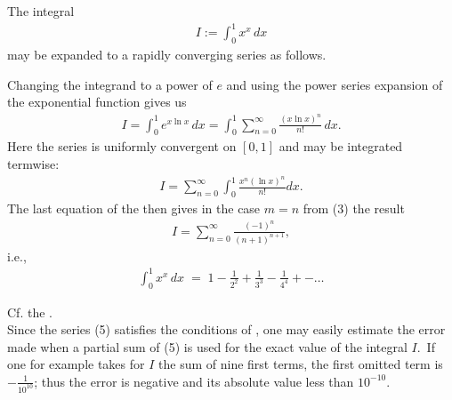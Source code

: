 \documentclass[12pt]{article}
\begin{document}
The integral
\begin{align}
I := \int_0^1 x^x\, dx
\end{align}
may be expanded to a rapidly converging series as follows.

Changing the integrand to a power of $e$ and using the power series expansion of the 
exponential function gives us
\begin{align}
I = \int_0^1 e^{x\ln x}\, dx 
= \int_0^1 \sum_{n=0}^\infty\frac{(x\ln x)^n}{n!}\, dx.
\end{align}
Here the series is uniformly convergent on $[0,1]$ and may be 
integrated termwise:
\begin{align}
I = \sum_{n=0}^\infty\int_0^1\frac{x^n(\ln x)^n}{n!}dx.
\end{align}
The last equation of the  
then gives in the case $m = n$ from (3) the result
\begin{align}
I = \sum_{n=0}^\infty\frac{(-1)^n}{(n\!+\!1)^{n+1}},
\end{align}
i.e.,
\begin{align}
\int_0^1 x^x\, dx \;=\; 
1-\frac{1}{2^2}+\frac{1}{3^3}-\frac{1}{4^4}+-\ldots
\end{align}

Cf. the .\\

Since the series (5) satisfies the conditions of 
, 
one may easily estimate the error made when a partial sum of (5) is used for the exact value of the integral 
$I$.\, If one for example takes for $I$ the sum of nine first
terms, the first omitted term is $-\frac{1}{10^{10}}$; thus the 
error is negative and its absolute value less than $10^{-10}$.\\
\end{document}
